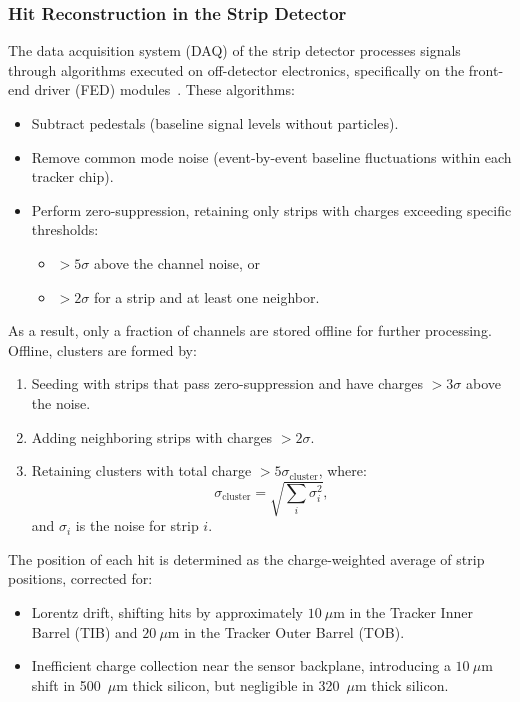 \subsubsection{Hit Reconstruction in the Strip Detector}

The data acquisition system (DAQ) of the strip detector processes signals through algorithms executed on off-detector electronics, specifically on the front-end driver (FED) modules~\cite{CMS:2014pgm}. These algorithms:
\begin{itemize}
    \item Subtract pedestals (baseline signal levels without particles).
    \item Remove common mode noise (event-by-event baseline fluctuations within each tracker chip).
    \item Perform zero-suppression, retaining only strips with charges exceeding specific thresholds:
    \begin{itemize}
        \item \(> 5\sigma\) above the channel noise, or
        \item \(> 2\sigma\) for a strip and at least one neighbor.
    \end{itemize}
\end{itemize}

As a result, only a fraction of channels are stored offline for further processing.\\

Offline, clusters are formed by:
\begin{enumerate}
    \item Seeding with strips that pass zero-suppression and have charges \(> 3\sigma\) above the noise.
    \item Adding neighboring strips with charges \(> 2\sigma\).
    \item Retaining clusters with total charge \(> 5\sigma_{\text{cluster}}\), where:
    \[
    \sigma_{\text{cluster}} = \sqrt{\sum_i \sigma_i^2},
    \]
    and \(\sigma_i\) is the noise for strip \(i\).
\end{enumerate}

The position of each hit is determined as the charge-weighted average of strip positions, corrected for:
\begin{itemize}
    \item Lorentz drift, shifting hits by approximately \(10~\mu\text{m}\) in the Tracker Inner Barrel (TIB) and \(20~\mu\text{m}\) in the Tracker Outer Barrel (TOB).
    \item Inefficient charge collection near the sensor backplane, introducing a \(10~\mu\text{m}\) shift in 500~\(\mu\text{m}\) thick silicon, but negligible in 320~\(\mu\text{m}\) thick silicon.
\end{itemize}

